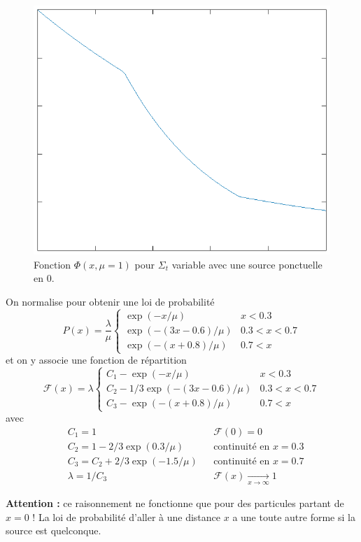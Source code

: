 \message{ !name(rapport_monte_carlo.tex)}\documentclass[12pt,a4paper]{article}
\newcommand{\F}{\mathcal{F}}
\begin{document}
\begin{figure}[h]
  \centering
  \includegraphics[width=.7\textwidth]{phi}
  \caption{Fonction $\Phi(x, \mu=1)$ pour $\Sigma_t$ variable avec une source ponctuelle en 0.}
  \label{fig:phi}
\end{figure}

On normalise pour obtenir une loi de probabilité
\begin{equation}
  P(x) = \frac{\lambda}{\mu}
  \begin{cases}
    \exp(-x/\mu)         & x<0.3\\
    \exp(-(3x-0.6)/\mu) & 0.3<x<0.7\\
    \exp(-(x+0.8)/\mu)  & 0.7<x
  \end{cases}
\end{equation}
et on y associe une fonction de répartition
\begin{equation}
  \F(x) = \lambda
  \begin{cases}
    C_1 - \exp(-x/\mu)             & x<0.3\\    
    C_2 - 1/3 \exp(-(3x-0.6)/\mu) & 0.3<x<0.7\\
    C_3 - \exp(-(x+0.8)/\mu)      & 0.7<x      
  \end{cases}
\end{equation}
avec
\begin{align}
  &C_1 = 1 && \F(0)=0 \\
  &C_2 = 1 - 2/3 \exp(0.3/\mu) && \mbox{continuité en }x=0.3 \\
  &C_3 = C_2 + 2/3 \exp(-1.5/\mu) &&  \mbox{continuité en }x=0.7 \\
  &\lambda = 1/C_3 &&  \F(x)  \xrightarrow[x \to \infty]{} 1
\end{align}

\textbf{Attention : } ce raisonnement ne fonctionne que pour des particules partant de $x=0$ ! La loi de probabilité d'aller à une distance $x$ a une toute autre forme si la source est quelconque.
\end{document}
